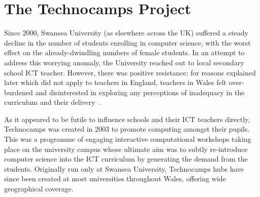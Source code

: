 \documentclass{llncs}
\begin{document}




\section{The Technocamps Project}\label{technocamps}

Since 2000, Swansea University (as elsewhere across the UK) suffered a
steady decline in the number of students enrolling in computer
science, with the worst effect on the already-dwindling numbers of
female students.  In an attempt to address this worrying anomaly, the
University reached out to local secondary school ICT teacher.
However, there was positive resistance; for reasons explained later
which did not apply to teachers in England, teachers in Wales felt
over-burdened and disinterested in exploring any perceptions of
inadequacy in the curriculum and their
delivery~\cite{crick+sentance:2011,brown-et-al-sigcse2012}.

As it appeared to be futile to influence schools and their ICT
teachers directly, Technocamps was created in 2003 to promote
computing amongst their pupils.  This was a programme of engaging
interactive computational workshops taking place on the university
campus whose ultimate aim was to subtly re-introduce computer science
into the ICT curriculum by generating the demand from the students.
Originally run only at Swansea University, Technocamps hubs have since
been created at most universities throughout Wales, offering wide
geographical coverage.
\end{document}
